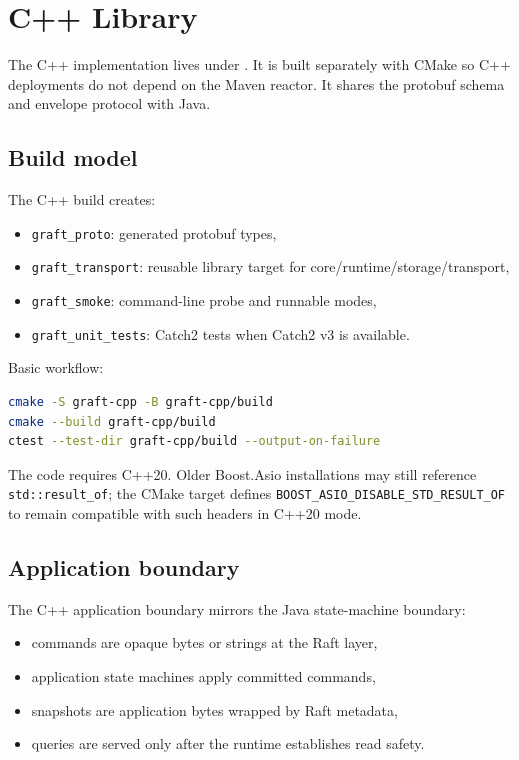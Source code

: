 \section{C++ Library}
\label{sec:CppLibrary}

The C++ implementation lives under . It is built separately
with CMake so C++ deployments do not depend on the Maven reactor. It shares the
protobuf schema and envelope protocol with Java.

\subsection{Build model}

The C++ build creates:

\begin{itemize}
\item \texttt{graft\_proto}: generated protobuf types,
\item \texttt{graft\_transport}: reusable library target for core/runtime/storage/transport,
\item \texttt{graft\_smoke}: command-line probe and runnable modes,
\item \texttt{graft\_unit\_tests}: Catch2 tests when Catch2 v3 is available.
\end{itemize}

Basic workflow:

\begin{lstlisting}[language=bash,caption={C++ build workflow}]
cmake -S graft-cpp -B graft-cpp/build
cmake --build graft-cpp/build
ctest --test-dir graft-cpp/build --output-on-failure
\end{lstlisting}

The code requires C++20. Older Boost.Asio installations may still reference
\texttt{std::result\_of}; the CMake target defines
\texttt{BOOST\_ASIO\_DISABLE\_STD\_RESULT\_OF} to remain compatible with such
headers in C++20 mode.

\subsection{Application boundary}

The C++ application boundary mirrors the Java state-machine boundary:

\begin{itemize}
\item commands are opaque bytes or strings at the Raft layer,
\item application state machines apply committed commands,
\item snapshots are application bytes wrapped by Raft metadata,
\item queries are served only after the runtime establishes read safety.
\end{itemize}


